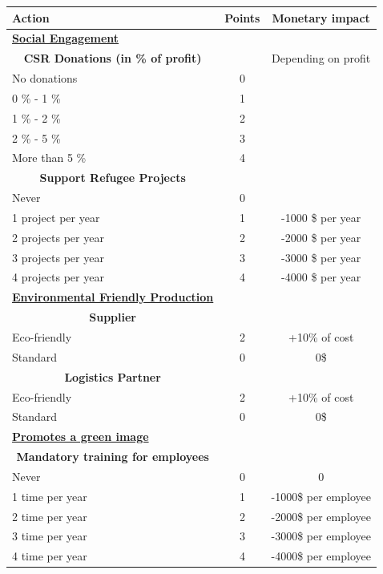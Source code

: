 \begin{longtable}[]{l|c|c}
     \textbf{Action} & \textbf{Points} & \textbf{Monetary impact} \\
     \hline \hline
     \underline{\textbf{Social Engagement}} & & \\ [1ex]
     \multicolumn{1}{c|}{\textbf{CSR Donations (in \% of profit)}} & & Depending on profit \\
     No donations & 0 &  \\
     0 \% - 1 \% & 1 &  \\
     1 \% - 2 \% & 2 &   \\
     2 \% - 5 \% & 3 &   \\
     More than 5 \% & 4 &   \\ [1ex]
     \multicolumn{1}{c|}{\textbf{Support Refugee Projects}} & & \\
     Never & 0 &  \\
     1 project per year & 1 & -1000 \$ per year  \\
     2 projects per year & 2 & -2000 \$ per year   \\
     3 projects per year & 3 & -3000 \$ per year  \\
     4 projects per year & 4 & -4000 \$ per year  \\
     \hline \hline
     \underline{\textbf{Environmental Friendly Production}} & & \\ [1ex]
     \multicolumn{1}{c|}{\textbf{Supplier}} & & \\
     Eco-friendly & 2 & +10\% of cost \\
     Standard & 0 & 0\$  \\
     \multicolumn{1}{c|}{\textbf{Logistics Partner}} & & \\
     Eco-friendly & 2 & +10\% of cost \\
     Standard & 0 & 0\$  \\
     \hline \hline
     \underline{\textbf{Promotes a green image}} & & \\ [1ex]
     \multicolumn{1}{c|}{\textbf{Mandatory training for employees}} & & \\
     Never & 0 & 0 \\
     1 time per year & 1 & -1000\$ per employee  \\
     2 time per year & 2 & -2000\$ per employee  \\
     3 time per year & 3 & -3000\$ per employee  \\
     4 time per year & 4 & -4000\$ per employee  \\

\end{longtable}

